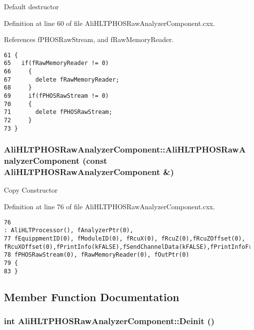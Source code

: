 Default destructor 

Definition at line 60 of file Ali\-HLTPHOSRaw\-Analyzer\-Component.cxx.

References f\-PHOSRaw\-Stream, and f\-Raw\-Memory\-Reader.

\footnotesize\begin{verbatim}61 {
65   if(fRawMemoryReader != 0)
66     {
67       delete fRawMemoryReader;
68     }
69     if(fPHOSRawStream != 0)
70     {
71       delete fPHOSRawStream;
72     }
73 }
\end{verbatim}\normalsize 


\subsubsection{\setlength{\rightskip}{0pt plus 5cm}Ali\-HLTPHOSRaw\-Analyzer\-Component::Ali\-HLTPHOSRaw\-Analyzer\-Component (const {\bf Ali\-HLTPHOSRaw\-Analyzer\-Component} \&)}\label{classAliHLTPHOSRawAnalyzerComponent_a2}


Copy Constructor 

Definition at line 76 of file Ali\-HLTPHOSRaw\-Analyzer\-Component.cxx.

\footnotesize\begin{verbatim}76                                                                                                       : AliHLTProcessor(), fAnalyzerPtr(0), 
77 fEquippmentID(0), fModuleID(0), fRcuX(0), fRcuZ(0),fRcuZOffset(0), fRcuXOffset(0),fPrintInfo(kFALSE),fSendChannelData(kFALSE),fPrintInfoFrequncy(1000), 
78 fPHOSRawStream(0), fRawMemoryReader(0), fOutPtr(0)
79 {
83 }
\end{verbatim}\normalsize 




\subsection{Member Function Documentation}
\subsubsection{\setlength{\rightskip}{0pt plus 5cm}int Ali\-HLTPHOSRaw\-Analyzer\-Component::Deinit ()\hspace{0.3cm}{\tt  [virtual]}}\label{classAliHLTPHOSRawAnalyzerComponent_a5}


